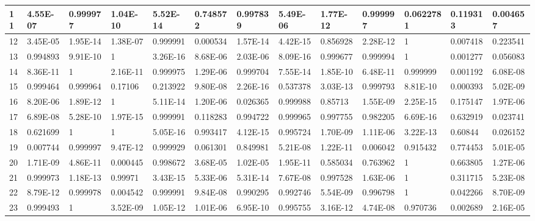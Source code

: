 \documentclass[a4paper,10pt]{article}
\begin{document}
\begin{centering}
{\begin{tabular}{ |l|l|l|l|l|l|l|l|l|l|l|l|l| }
11	       & 4.55E-07 & 0.999977 & 1.04E-10 & 5.52E-14 & 0.748572 & 0.997839 &  5.49E-06 & 1.77E-12  & 0.999997 &  0.0622781& 0.119313 & 0.004657 \\ \hline                
12	       & 3.45E-05 & 1.95E-14 & 1.38E-07 & 0.999991 & 0.000534 & 1.57E-14 &  4.42E-15 & 0.856928  & 2.28E-12 &  1        & 0.007418 & 0.223541 \\ \hline         
13	       & 0.994893 & 9.91E-10 & 1 	    & 3.26E-16 & 8.68E-06 & 2.03E-06 &  8.09E-16 & 0.999677  & 0.999994 &  1        & 0.001277 & 0.056083 \\ \hline        
14	       & 8.36E-11 & 1        & 2.16E-11 & 0.999975 & 1.29E-06 & 0.999704 &  7.55E-14 & 1.85E-10  & 6.48E-11 &  0.999999 & 0.001192 & 6.08E-08 \\ \hline               
15	       & 0.999464 & 0.999964 & 0.17106  & 0.213922 & 9.80E-08 & 2.26E-16 &  0.537378 & 3.03E-13  & 0.999793 &  8.81E-10 & 0.000393 & 5.02E-09 \\ \hline               
16	       & 8.20E-06 & 1.89E-12 & 1  	    & 5.11E-14 & 1.20E-06 & 0.026365 &  0.999988 & 0.85713   & 1.55E-09 &  2.25E-15 & 0.175147 & 1.97E-06 \\ \hline             
17	       & 6.89E-08 & 5.28E-10 & 1.97E-15 & 0.999991 & 0.118283 & 0.994722 &  0.999965 & 0.997755  & 0.982205 &  6.69E-16 & 0.632919 & 0.023741 \\ \hline              
18	       & 0.621699 & 1        & 1   	    & 5.05E-16 & 0.993417 & 4.12E-15 &  0.995724 & 1.70E-09  & 1.11E-06 &  3.22E-13 & 0.60844  & 0.026152 \\ \hline             
19	       & 0.007744 & 0.999997 & 9.47E-12 & 0.999929 & 0.061301 & 0.849981 &  5.21E-08 & 1.22E-11  & 0.006042 &  0.915432 & 0.774453 & 5.01E-05 \\ \hline                
20	       & 1.71E-09 & 4.86E-11 & 0.000445 & 0.998672 & 3.68E-05 & 1.02E-05 &  1.95E-11 & 0.585034  & 0.763962 &  1        & 0.663805 & 1.27E-06 \\ \hline      
21	       & 0.999973 & 1.18E-13 & 0.99971  & 3.43E-15 & 5.33E-06 & 5.31E-14 &  7.67E-08 & 0.997528  & 1.63E-06 &  1        & 0.311715 & 5.23E-08 \\ \hline      
22	       & 8.79E-12 & 0.999978 & 0.004542 & 0.999991 & 9.84E-08 & 0.990295 &  0.992746 & 5.54E-09  & 0.996798 &  1        & 0.042266 & 8.70E-09 \\ \hline       
23	       & 0.999493 & 1        & 3.52E-09 & 1.05E-12 & 1.01E-06 & 6.95E-10 &  0.995755 & 3.16E-12  & 4.74E-08 &  0.970736 & 0.002689 & 2.16E-05 \\ \hline               

\end{tabular}}
\end{centering}
\end{document}
